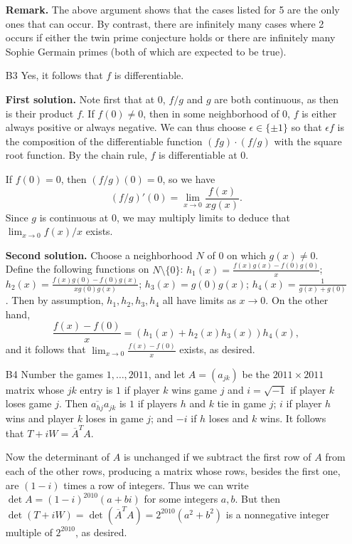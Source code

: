 \documentclass[amssymb,twocolumn,pra,10pt,aps]{revtex4-1}
\begin{document}
\begin{itemize}
\textbf{Remark.}
The above argument shows that the cases listed for 5 are the only ones that can occur. By contrast,
there are infinitely many cases where 2 occurs if either the twin prime conjecture holds or there are
infinitely many Sophie Germain primes (both of which are expected to be true).

\item[B3]
Yes, it follows that $f$ is differentiable.

\noindent
\textbf{First solution.}
Note first that at $0$, $f/g$ and $g$ are both continuous, as then is their product $f$.
If $f(0) \neq 0$, then in some neighborhood of $0$, $f$ is either always positive or always
negative. We can thus choose $\epsilon \in \{\pm 1\}$ so that
$\epsilon f$ is the composition of the differentiable function
$(fg)\cdot (f/g)$ with the square root function. By the chain rule, $f$ is differentiable at $0$.

If $f(0) = 0$, then $(f/g)(0) = 0$, so we have
\[
(f/g)'(0) = \lim_{x \to 0}
\frac{f(x)}{x g(x)}.
\]
Since $g$ is continuous at 0, we may multiply limits to deduce that $\lim_{x \to 0} f(x)/x$ exists.

\noindent
\textbf{Second solution.}
Choose a neighborhood $N$ of $0$ on which $g(x) \neq 0$.
Define the following functions on $N \setminus \{0\}$:
$h_1(x) = \frac{f(x)g(x)-f(0)g(0)}{x}$;
$h_2(x) = \frac{f(x)g(0)-f(0)g(x)}{xg(0)g(x)}$;
$h_3(x) = g(0)g(x)$;
$h_4(x) = \frac{1}{g(x)+g(0)}$. Then
by assumption, $h_1,h_2,h_3,h_4$ all have limits as $x \to 0$. On the
other hand,
\[
\frac{f(x)-f(0)}{x} = (h_1(x)+h_2(x)h_3(x))h_4(x),
\]
and it follows that $\lim_{x\to 0} \frac{f(x)-f(0)}{x}$ exists, as desired.

\item[B4]
Number the games $1,\ldots,2011$, and let $A = (a_{jk})$ be the $2011 \times 2011$ matrix whose $jk$ entry is $1$ if player $k$ wins game $j$ and $i = \sqrt{-1}$ if player $k$ loses game $j$. Then $\overline{a_{hj}}a_{jk}$ is $1$ if players $h$ and $k$ tie in game $j$; $i$ if player $h$ wins and player $k$ loses in game $j$; and $-i$ if $h$ loses and $k$ wins. It follows that $T + i W = \overline{A}^T A$.

Now the determinant of $A$ is unchanged if we subtract the first row of $A$ from each of the other rows, producing a matrix whose rows, besides the first one, are $(1-i)$ times a row of integers. Thus we can write $\det A = (1-i)^{2010}(a+bi)$ for some integers $a,b$. But then
$\det(T+iW) = \det(\overline{A}^T A) = 2^{2010}(a^2+b^2)$ is a nonnegative integer multiple of $2^{2010}$, as desired.


\end{itemize}
\end{document}
